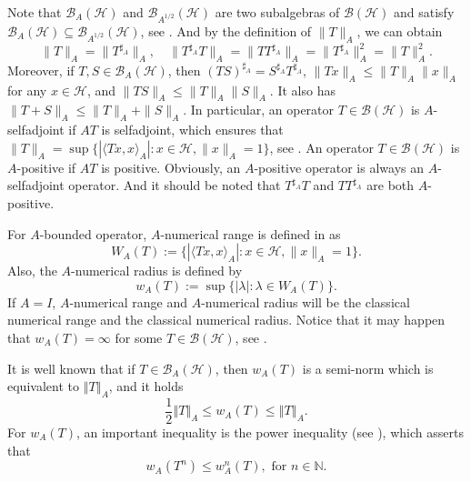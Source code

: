 \documentclass{article}
\newcommand{\normA}[1]{{\left\Vert#1\right\Vert}_{A}}
\newcommand{\N}{\mathbb N}
\newcommand {\h}{\mathcal{H}}
\renewcommand {\b}{\mathcal{B}}
\begin{document}
Note that $\mathcal{B}_A(\mathcal{H})$ and $\mathcal{B}_{A^{1/2}}(\mathcal{H})$ are two subalgebras of $\mathcal{B}(\mathcal{H})$ and satisfy $\mathcal{B}_A(\mathcal{H}) \subseteq \mathcal{B}_{A^{1/2}}(\mathcal{H})$, see \cite{ACG1, ACG2}. And by the definition of $\|T\|_A$, we can obtain
$$\|T\|_A = \|T^{\sharp_A}\|_A, \quad \|T^{\sharp_A} T\|_A = \|T T^{\sharp_A}\|_A = \|T^{\sharp_A}\|_A^2 = \|T\|_A^2.$$
Moreover, if $T, S \in \mathcal{B}_A(\mathcal{H})$, then $(TS)^{\sharp_A} = S^{\sharp_A} T^{\sharp_A}$, $\|T x\|_A \leq \|T\|_A \|x\|_A$ for any $x \in \mathcal{H}$, and $\|T S\|_A \leq \|T\|_A \|S\|_A$. It also has $\|T + S\|_A \leq \|T\|_A + \|S\|_A$. In particular, an operator $T \in \mathcal{B}(\mathcal{H})$ is $A$-selfadjoint if $AT$ is selfadjoint, which ensures that $\|T\|_A = \sup\{|\langle T x, x \rangle_A| : x \in \mathcal{H}, \|x\|_A = 1\}$, see \cite{Feki}. An operator $T \in \mathcal{B}(\mathcal{H})$ is $A$-positive if $AT$ is positive. Obviously, an $A$-positive operator is always an $A$-selfadjoint operator. And it should be noted that $T^{\sharp_A} T$ and $T T^{\sharp_A}$ are both $A$-positive.

For $A$-bounded operator, $A$-numerical range is defined in \cite{HFA} as
$$W_A(T) := \{|\langle T x, x \rangle_A| : x \in \mathcal{H}, \|x\|_A = 1\}.$$
Also, the $A$-numerical radius is defined by
$$w_A(T) := \sup\{|\lambda| : \lambda \in W_A(T)\}.$$
If $A = I$, $A$-numerical range and $A$-numerical radius will be the classical numerical range and the classical numerical radius. Notice that it may happen that $w_A(T) = \infty$ for some $T \in \mathcal{B}(\mathcal{H})$, see \cite{BN}.

It is well known that if $T\in\b_A(\h)$, then $w_A(T)$ is a semi-norm which is equivalent to
$\normA{T}$, and it holds
\begin{equation}\label{IN-1}
  \frac{1}{2}\normA{T}\leq w_A(T)\leq \normA{T}.
\end{equation}
For $w_A(T)$, an important inequality is the power inequality (see \cite[Proposition 3.10]{MXZ}), which asserts that
\begin{equation}\label{IN-2}
  w_A(T^n)\leq w_A^n(T),\,\,\mbox{for $n\in\N$}.
\end{equation}
\end{document}

